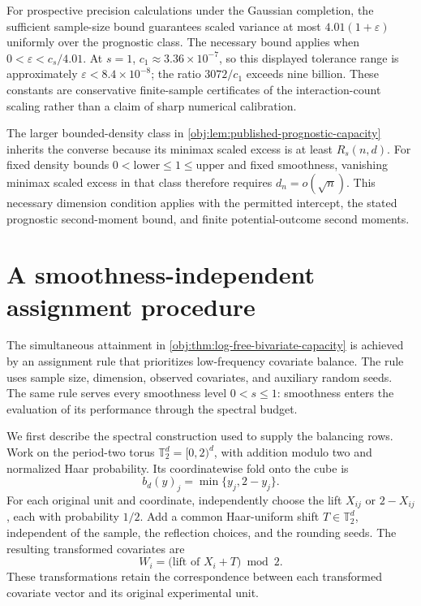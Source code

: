 \documentclass[11pt]{article}
\begin{document}
For prospective precision calculations under the Gaussian completion, the sufficient sample-size bound guarantees scaled variance at most \(4.01(1+\varepsilon)\) uniformly over the prognostic class. The necessary bound applies when \(0<\varepsilon<c_s/4.01\). At \(s=1\), \(c_1\approx3.36\times10^{-7}\), so this displayed tolerance range is approximately \(\varepsilon<8.4\times10^{-8}\); the ratio \(3072/c_1\) exceeds nine billion. These constants are conservative finite-sample certificates of the interaction-count scaling rather than a claim of sharp numerical calibration.

The larger bounded-density class in \cref{obj:lem:published-prognostic-capacity} inherits the converse because its minimax scaled excess is at least \(R_s(n,d)\). For fixed density bounds \(0<\mathrm{lower}\leq1\leq\mathrm{upper}\) and fixed smoothness, vanishing minimax scaled excess in that class therefore requires \(d_n=o(\sqrt n)\). This necessary dimension condition applies with the permitted intercept, the stated prognostic second-moment bound, and finite potential-outcome second moments.


\section{A smoothness-independent assignment procedure}

The simultaneous attainment in \cref{obj:thm:log-free-bivariate-capacity} is achieved by an assignment rule that prioritizes low-frequency covariate balance. The rule uses sample size, dimension, observed covariates, and auxiliary random seeds. The same rule serves every smoothness level \(0<s\leq1\): smoothness enters the evaluation of its performance through the spectral budget.

We first describe the spectral construction used to supply the balancing rows. Work on the period-two torus \(\mathbb T_2^d=[0,2)^d\), with addition modulo two and normalized Haar probability. Its coordinatewise fold onto the cube is
\[
b_d(y)_j=\min\{y_j,2-y_j\}.
\]
For each original unit and coordinate, independently choose the lift \(X_{ij}\) or \(2-X_{ij}\), each with probability \(1/2\). Add a common Haar-uniform shift \(T\in\mathbb T_2^d\), independent of the sample, the reflection choices, and the rounding seeds. The resulting transformed covariates are
\[
W_i=\bigl(\text{lift of }X_i+T\bigr)\bmod 2.
\]
These transformations retain the correspondence between each transformed covariate vector and its original experimental unit.
\end{document}
